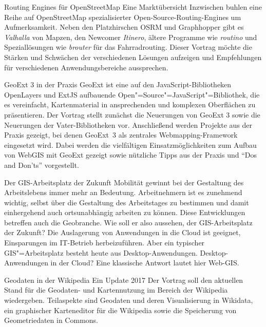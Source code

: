 %
{Routing Engines für OpenStreetMap}%
{Eine Marktübersicht}%
{Inzwischen buhlen eine Reihe auf OpenStreetMap spezialisierter Open-Source-Routing-Engines um
Aufmerksamkeit. Neben den Platzhirschen OSRM und Graphhopper gibt es \emph{Valhalla} von Mapzen, den
Newcomer \emph{Itinero}, ältere Programme wie \emph{routino} und Speziallösungen wie \emph{brouter} für das
Fahrradrouting. Dieser Vortrag möchte die Stärken und Schwächen der verschiedenen Lösungen aufzeigen
und Empfehlungen für verschiedenen Anwendungsbereiche aussprechen.}
\enlargethispage{0.2\baselineskip}
\vspace{-0.5\baselineskip}




%
{GeoExt 3 in der Praxis}%
{}%
{GeoExt ist eine auf den JavaScript-Bibliotheken Open\-Lay\-ers und ExtJS aufbauende
  Open"=Source"=JavaScript"=Bibliothek, die es vereinfacht, Kartenmaterial in ansprechenden und komplexen
  Oberflächen zu präsentieren.  Der Vortrag stellt zunächst die Neuerungen von GeoExt 3 sowie die
  Neuerungen der Vater-Bibliotheken
vor.  Anschließend werden Projekte aus der Praxis gezeigt, bei denen GeoExt~3 als zentrales
Webmapping-Framework eingesetzt wird. Dabei werden die vielfältigen Einsatzmöglichkeiten zum Aufbau
von WebGIS mit GeoExt gezeigt sowie nützliche Tipps aus der Praxis und "`Dos and Don'ts"'
vorgestellt.}

%
{Der GIS-Arbeitsplatz der Zukunft}%
{}%
{Mobilität gewinnt bei der Gestaltung des Arbeitslebens immer mehr an Bedeutung. Arbeitnehmern ist
es zunehmend wichtig, selbst über die Gestaltung des Arbeitstages zu bestimmen und damit
einhergehend auch ortsunabhängig arbeiten zu können. Diese Entwicklungen betreffen auch die
Geobranche. Wie soll er also aussehen, der GIS-Arbeitsplatz der Zukunft?  Die Auslagerung von
Anwendungen in die Cloud ist geeignet, Einsparungen im IT-Betrieb herbeizuführen. Aber ein typischer
GIS"=Arbeitsplatz besteht heute aus Desktop-Anwendungen. Desktop-Anwendungen in der Cloud? Eine
klassische Antwort lautet hier Web-GIS.}

%
{Geodaten in der Wikipedia}%
{Ein Update 2017}%
{Der Vortrag soll den aktuellen Stand für die Geodaten- und Kartennutzung im Bereich der Wikipedia
wiedergeben. Teilaspekte sind Geodaten und deren Visualisierung in Wikidata, ein graphischer
Karteneditor für die Wikipedia sowie die Speicherung von Geometriedaten in Commons.  }

